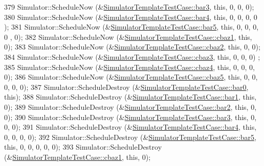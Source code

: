 \begin{DoxyCode}
379   Simulator::ScheduleNow (&\hyperlink{classSimulatorTemplateTestCase_aea52cc1b6dabac3782131bc96f7e3556}{SimulatorTemplateTestCase::bar3}, \textcolor{keyword}{this}, 0, 0, 0);
380   Simulator::ScheduleNow (&\hyperlink{classSimulatorTemplateTestCase_a0a46a38ced46c32a980d1458f23f26ac}{SimulatorTemplateTestCase::bar4}, \textcolor{keyword}{this}, 0, 0, 0, 0
      );
381   Simulator::ScheduleNow (&\hyperlink{classSimulatorTemplateTestCase_a75066b2e82301377dddc07d887c96853}{SimulatorTemplateTestCase::bar5}, \textcolor{keyword}{this}, 0, 0, 0, 0
      , 0);
382   Simulator::ScheduleNow (&\hyperlink{classSimulatorTemplateTestCase_a893ae41537567fc7e95f011f370e74ba}{SimulatorTemplateTestCase::cbaz1}, \textcolor{keyword}{this}, 0);
383   Simulator::ScheduleNow (&\hyperlink{classSimulatorTemplateTestCase_a0e58a1e62ebad4e4d0717cc64075c496}{SimulatorTemplateTestCase::cbaz2}, \textcolor{keyword}{this}, 0, 0);
384   Simulator::ScheduleNow (&\hyperlink{classSimulatorTemplateTestCase_a89bc22b2a32d6cdf026e8f7209a2fbbd}{SimulatorTemplateTestCase::cbaz3}, \textcolor{keyword}{this}, 0, 0, 0)
      ;
385   Simulator::ScheduleNow (&\hyperlink{classSimulatorTemplateTestCase_ac464eb9dcde4c15e5f63e9ae61fbc5a7}{SimulatorTemplateTestCase::cbaz4}, \textcolor{keyword}{this}, 0, 0, 0,
       0);
386   Simulator::ScheduleNow (&\hyperlink{classSimulatorTemplateTestCase_a68c3789ba056bcddf5f1575d4c9c0548}{SimulatorTemplateTestCase::cbaz5}, \textcolor{keyword}{this}, 0, 0, 0,
       0, 0);
387   Simulator::ScheduleDestroy (&\hyperlink{classSimulatorTemplateTestCase_a7c53480e1b906bfeaea5e0070ff5cc0c}{SimulatorTemplateTestCase::bar0}, \textcolor{keyword}{this});
388   Simulator::ScheduleDestroy (&\hyperlink{classSimulatorTemplateTestCase_a83631fe15f6b4aaffcf702e71a664205}{SimulatorTemplateTestCase::bar1}, \textcolor{keyword}{this}, 0);
389   Simulator::ScheduleDestroy (&\hyperlink{classSimulatorTemplateTestCase_a0a416b76615bb0e90f1312694f09133b}{SimulatorTemplateTestCase::bar2}, \textcolor{keyword}{this}, 0, 0);
390   Simulator::ScheduleDestroy (&\hyperlink{classSimulatorTemplateTestCase_aea52cc1b6dabac3782131bc96f7e3556}{SimulatorTemplateTestCase::bar3}, \textcolor{keyword}{this}, 0, 0, 
      0);
391   Simulator::ScheduleDestroy (&\hyperlink{classSimulatorTemplateTestCase_a0a46a38ced46c32a980d1458f23f26ac}{SimulatorTemplateTestCase::bar4}, \textcolor{keyword}{this}, 0, 0, 
      0, 0);
392   Simulator::ScheduleDestroy (&\hyperlink{classSimulatorTemplateTestCase_a75066b2e82301377dddc07d887c96853}{SimulatorTemplateTestCase::bar5}, \textcolor{keyword}{this}, 0, 0, 
      0, 0, 0);
393   Simulator::ScheduleDestroy (&\hyperlink{classSimulatorTemplateTestCase_a893ae41537567fc7e95f011f370e74ba}{SimulatorTemplateTestCase::cbaz1}, \textcolor{keyword}{this}, 0);

\end{DoxyCode}
